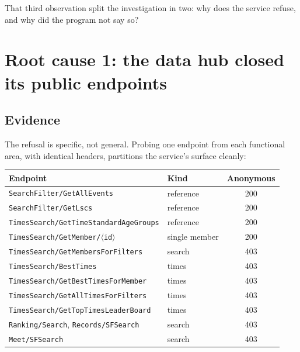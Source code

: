 \documentclass[11pt]{article}
\newcommand{\code}[1]{\texttt{#1}}
\begin{document}
\noindent That third observation split the investigation in two: why
does the service refuse, and why did the program not say so?

\section{Root cause 1: the data hub closed its public endpoints}

\subsection{Evidence}

The refusal is specific, not general.  Probing one endpoint from each
functional area, with identical headers, partitions the service's
surface cleanly:

\begin{center}
\begin{tabular}{llc}
\toprule
\textbf{Endpoint} & \textbf{Kind} & \textbf{Anonymous} \\
\midrule
\code{SearchFilter/GetAllEvents}            & reference & \textcolor{good}{200} \\
\code{SearchFilter/GetLscs}                 & reference & \textcolor{good}{200} \\
\code{TimesSearch/GetTimeStandardAgeGroups} & reference & \textcolor{good}{200} \\
\code{TimesSearch/GetMember/$\langle$id$\rangle$} & single member & \textcolor{good}{200} \\
\midrule
\code{TimesSearch/GetMembersForFilters}     & search & \textcolor{bad}{403} \\
\code{TimesSearch/BestTimes}                & times  & \textcolor{bad}{403} \\
\code{TimesSearch/GetBestTimesForMember}    & times  & \textcolor{bad}{403} \\
\code{TimesSearch/GetAllTimesForFilters}    & times  & \textcolor{bad}{403} \\
\code{TimesSearch/GetTopTimesLeaderBoard}   & times  & \textcolor{bad}{403} \\
\code{Ranking/Search}, \code{Records/SFSearch} & search & \textcolor{bad}{403} \\
\code{Meet/SFSearch}                        & search & \textcolor{bad}{403} \\
\bottomrule
\end{tabular}
\end{center}
\end{document}
